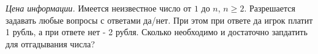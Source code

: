 \begin{comment}
\begin{definition}
\textit{Относительной энтропией} случайных величин $X \backsim P$ и $Y \backsim Q$ на множестве $A$ (или расстоянием Кульбака-Лейблера между ними) называется
\begin{center}
$KL(P||Q) = \sum_{a \in A} p_a \log \frac{p_a}{q_a}$. 
\end{center}
В статистике эта величина определяет то, насколько "неэффективно" использование распределения $Q$ для аппроксимации распределедния $P$, или как много дополнительных бит мы заплатим за такую аппроксимацию.
\end{definition}

\begin{definition}
\textit{Кодом} слова $w \in A^{len(w)}$ в алфавите $\Sigma$ называется отображение $C(w) : w \rightarrow \sigma$, $\sigma \in B^{len(\sigma)}$. $len(\sigma)$ - длина кодового слова.
\end{definition}

\subsection{Задачи}
\end{comment}
\begin{problem} \textit{Цена информации.} Имеется неизвестное число от $1$ до $n$, $n \geq 2$. Разрешается задавать любые вопросы с ответами да/нет. При этом при ответе да игрок платит 1 рубль, а при ответе нет - 2 рубля. Сколько необходимо и достаточно запдатить для отгадывания числа?
\end{problem}

